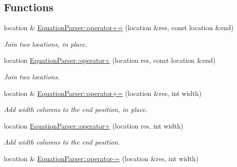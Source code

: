 \subsection*{Functions}
\begin{DoxyCompactItemize}
\item 
location \& \hyperlink{location_8hh_a857fd1b178de784f9a631c1268232e85}{Equation\+Parser\+::operator+=} (location \&res, const location \&end)\hypertarget{location_8hh_a857fd1b178de784f9a631c1268232e85}{}\label{location_8hh_a857fd1b178de784f9a631c1268232e85}

\begin{DoxyCompactList}\small\item\em Join two locations, in place. \end{DoxyCompactList}\item 
location \hyperlink{location_8hh_a2c17bf52a2f6f8c74da735c324ed71ea}{Equation\+Parser\+::operator+} (location res, const location \&end)\hypertarget{location_8hh_a2c17bf52a2f6f8c74da735c324ed71ea}{}\label{location_8hh_a2c17bf52a2f6f8c74da735c324ed71ea}

\begin{DoxyCompactList}\small\item\em Join two locations. \end{DoxyCompactList}\item 
location \& \hyperlink{location_8hh_a5a8ab2a400786124ef70e1403c1b16db}{Equation\+Parser\+::operator+=} (location \&res, int width)\hypertarget{location_8hh_a5a8ab2a400786124ef70e1403c1b16db}{}\label{location_8hh_a5a8ab2a400786124ef70e1403c1b16db}

\begin{DoxyCompactList}\small\item\em Add {\itshape width} columns to the end position, in place. \end{DoxyCompactList}\item 
location \hyperlink{location_8hh_a81130cb033ab2d03e8f3aee42233514e}{Equation\+Parser\+::operator+} (location res, int width)\hypertarget{location_8hh_a81130cb033ab2d03e8f3aee42233514e}{}\label{location_8hh_a81130cb033ab2d03e8f3aee42233514e}

\begin{DoxyCompactList}\small\item\em Add {\itshape width} columns to the end position. \end{DoxyCompactList}\item 
location \& \hyperlink{location_8hh_a623138b41508502b7217bb9d33aa7998}{Equation\+Parser\+::operator-\/=} (location \&res, int width)\hypertarget{location_8hh_a623138b41508502b7217bb9d33aa7998}{}\label{location_8hh_a623138b41508502b7217bb9d33aa7998}


\end{DoxyCompactItemize}
